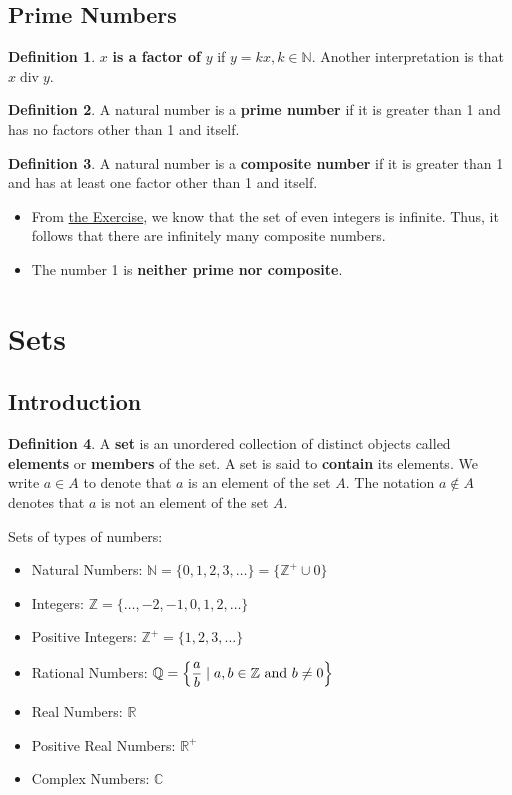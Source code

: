 \documentclass[article, 12pt]{article}
\theoremstyle{definition}
\newtheorem{definition}{Definition}[subsection]
\newcommand{\df}{\displaystyle\frac} %
\newcommand{\Div}[1]{\;\mathrm{div}\; #1} %
\DeclarePairedDelimiter\set{\{}{\}}
\newcommand{\unite}{\cup}
\newcommand{\reals}{\mathbb{R}}
\newcommand{\ints}{\mathbb{Z}}
\newcommand{\posints}{\mathbb{Z}^+}
\newcommand{\nats}{\mathbb{N}} %
\newcommand{\rats}{\mathbb{Q}}
\newcommand{\comps}{\mathbb{C}}
\begin{document}
    \subsection{Prime Numbers}
    \begin{definition}
        $x$ \textbf{is a factor of} $y$ if $y=kx, k \in \nats$. Another interpretation is that $x \Div{y}$.
    \end{definition}
    \begin{definition}
        A natural number is a \textbf{prime number} if it is greater than 1 and has no factors other than 1 and itself.
    \end{definition}
    \begin{definition}
        A natural number is a \textbf{composite number} if it is greater than 1 and has at least one factor other than 1 and itself.
    \end{definition}
    \begin{itemize}
        \item From \hyperref[ex:infinite]{the Exercise}, we know that the set of even integers is infinite. Thus, it follows that there are infinitely many composite numbers.
        \item The number 1 is \textbf{neither prime nor composite}.
    \end{itemize}
    \section{Sets}
    \subsection{Introduction}
    \begin{definition}
        A \textbf{set} is an unordered collection of distinct objects called \textbf{elements} or \textbf{members} of the set. A set is said to \textbf{contain} its elements. We write $a \in A$ to denote that $a$ is an element of the set $A$. The notation $a \notin A$ denotes that $a$ is not an element of the set $A$.   
    \end{definition}

    Sets of types of numbers:
    \begin{itemize}
        \item Natural Numbers: $\nats = \{0, 1, 2, 3, \dots\} = \{ \posints \unite 0\}$
        \item Integers: $\ints = \{\dots, -2, -1, 0, 1, 2, \dots\}$
        \item Positive Integers: $\ints^+ = \{1, 2, 3, \dots\}$
        \item Rational Numbers: $\rats = \set*{\df{a}{b} \mid a, b \in \ints \text{ and } b \neq 0}$
        \item Real Numbers: $\reals$
        \item Positive Real Numbers: $\reals^+$
        \item Complex Numbers: $\comps$
    \end{itemize}
\end{document}
